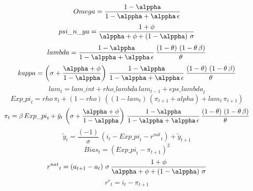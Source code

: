 \begin{dmath*}
Omega = \frac{1-{{\alppha}}}{1-{{\alppha}}+{{\alppha}}\, {{\epsilon}}}
\end{dmath*}
\begin{dmath*}
psi\_n\_ya = \frac{1+{{\phi}}}{{{\alppha}}+{{\phi}}+\left(1-{{\alppha}}\right)\, {{\sigma}}}
\end{dmath*}
\begin{dmath*}
lambda = \frac{1-{{\alppha}}}{1-{{\alppha}}+{{\alppha}}\, {{\epsilon}}}\, \frac{\left(1-{{\theta}}\right)\, \left(1-{{\theta}}\, {{\beta}}\right)}{{{\theta}}}
\end{dmath*}
\begin{dmath*}
kappa = \left({{\sigma}}+\frac{{{\alppha}}+{{\phi}}}{1-{{\alppha}}}\right)\, \frac{1-{{\alppha}}}{1-{{\alppha}}+{{\alppha}}\, {{\epsilon}}}\, \frac{\left(1-{{\theta}}\right)\, \left(1-{{\theta}}\, {{\beta}}\right)}{{{\theta}}}
\end{dmath*}
\begin{dmath}
{lam}_{t}={lam\_int}+{rho\_lambda}\, {lam}_{t-1}+{eps\_lambda}_{t}
\end{dmath}
\begin{dmath}
{Exp\_pi}_{t}={rho}\, {{\pi}}_{t}+\left(1-{rho}\right)\, \left(\left(1-{lam}_{t}\right)\, \left({{\pi}}_{t+1}+{alpha}\right)+{lam}_{t}\, {{\pi}}_{t+1}\right)
\end{dmath}
\begin{dmath}
{{\pi}}_{t}={{\beta}}\, {Exp\_pi}_{t}+{{\tilde y}}_{t}\, \left({{\sigma}}+\frac{{{\alppha}}+{{\phi}}}{1-{{\alppha}}}\right)\, \frac{1-{{\alppha}}}{1-{{\alppha}}+{{\alppha}}\, {{\epsilon}}}\, \frac{\left(1-{{\theta}}\right)\, \left(1-{{\theta}}\, {{\beta}}\right)}{{{\theta}}}
\end{dmath}
\begin{dmath}
{{\tilde y}}_{t}=\frac{\left(-1\right)}{{{\sigma}}}\, \left({{i}}_{t}-{Exp\_pi}_{t}-{{r^{nat}}}_{t}\right)+{{\tilde y}}_{t+1}
\end{dmath}
\begin{dmath}
{Bias}_{t}=\left({Exp\_pi}_{t}-{{\pi}}_{t+1}\right)^{2}
\end{dmath}
\begin{dmath}
{{r^{nat}}}_{t}=\left({{a}}_{t+1}-{{a}}_{t}\right)\, {{\sigma}}\, \frac{1+{{\phi}}}{{{\alppha}}+{{\phi}}+\left(1-{{\alppha}}\right)\, {{\sigma}}}
\end{dmath}
\begin{dmath}
{{r^r}}_{t}={{i}}_{t}-{{\pi}}_{t+1}
\end{dmath}
